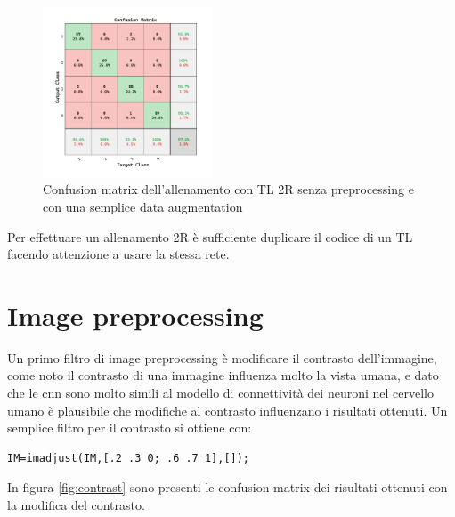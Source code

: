 \begin{figure}[ht]
    \centering
    \includegraphics[width=0.45\textwidth]{addestramento-rete-neurale/two-liscio.pdf}
    \caption{Confusion matrix dell'allenamento con TL 2R senza preprocessing e con una semplice data augmentation}
    \label{fig:two-liscio}
\end{figure}

Per effettuare un allenamento 2R è sufficiente duplicare il codice di un TL facendo attenzione a usare la stessa rete.

\section{Image preprocessing}\label{image-preprocessing}

Un primo filtro di image preprocessing è modificare il contrasto dell'immagine, come noto il contrasto di una immagine influenza molto la vista umana, e dato che le \gls{cnn} sono molto simili al modello di connettività dei neuroni nel cervello umano è plausibile che modifiche al contrasto influenzano i risultati  ottenuti. Un semplice filtro per il contrasto si ottiene con:
\begin{lstlisting}
IM=imadjust(IM,[.2 .3 0; .6 .7 1],[]);    
\end{lstlisting}

In figura \cref{fig:contrast} sono presenti le confusion matrix dei risultati ottenuti con la modifica del contrasto.

